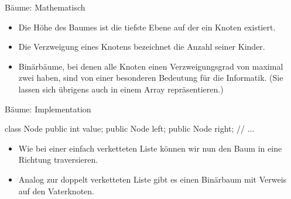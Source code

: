 \begin{frame}{Bäume: Mathematisch}
    \begin{itemize}[<+(1)->]
        \item Die Höhe des Baumes ist die tiefste Ebene auf der ein Knoten existiert.
        \item Die Verzweigung eines Knotens bezeichnet die Anzahl seiner Kinder.
        \item Binärbäume, bei denen alle Knoten einen Verzweigungsgrad von maximal zwei haben,\pause{} sind von einer besonderen Bedeutung für die Informatik.\pause{} (Sie lassen sich übrigens auch in einem Array repräsentieren.)
    \end{itemize}
\end{frame}

\begin{frame}[fragile]{Bäume: Implementation}
    \pause{}
    \begin{minipage}{0.4\linewidth}
\small%
\begin{plainjava}
class Node {
    public int value;
    public Node left;
    public Node right;
    // ...
}
\end{plainjava}
    \end{minipage}\hfill{}\pause{}\begin{minipage}{0.55\linewidth}%
\centering{}
\end{minipage}\vfill
    \begin{itemize}[<+(1)->]
        \item Wie bei einer einfach verketteten Liste können wir nun den Baum in eine Richtung traversieren.
        \item Analog zur doppelt verketteten Liste gibt es einen Binärbaum mit Verweis auf den Vaterknoten.
    \end{itemize}
\end{frame}


